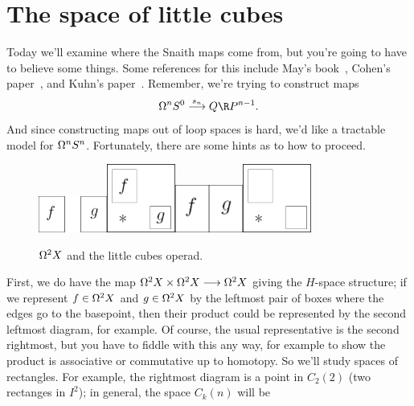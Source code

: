 \section{The space of little cubes} %
\label{TheSpaceOfLittleCubes}
\ifx\OutputTheSpaceOfLittleCubes\undefined\else
Today we'll examine where the Snaith maps come from, but you're going to have to believe some things.  Some references for this include May's book~\cite{May}, Cohen's paper~\cite{Cohen}, and Kuhn's paper~\cite{Kuhn}.  Remember, we're trying to construct maps
\[
\Loops^n S^0 \stackrel{s_n}{\to} Q\RP^{n-1}
.\]
And since constructing maps out of loop spaces is hard, we'd like a tractable model for $\Omega^n S^n$.  Fortunately, there are some hints as to how to proceed.

\begin{figure}[ht!]
\centering\includegraphics[width=0.2\textwidth]{figures/figure35-1.pdf}\;\includegraphics[width=0.2\textwidth]{figures/figure35-2.pdf}\;\includegraphics[width=0.2\textwidth]{figures/figure35-3.pdf}\;\includegraphics[width=0.2\textwidth]{figures/figure35-4.pdf}
\caption{\small $\Omega^2 X$ and the little cubes operad.}
\end{figure}
First, we do have the map $\Omega^2 X \times \Omega^2 X \longrightarrow \Omega^2 X$ giving the $H$-space structure; if we represent $f \in \Omega^2 X$ and $g \in \Omega^2 X$ by the leftmost pair of boxes where the edges go to the basepoint, then their product could be represented by the second leftmost diagram, for example.  Of course, the usual representative is the second rightmost, but you have to fiddle with this any way, for example to show the product is associative or commutative up to homotopy.  So we'll study spaces of rectangles.  For example, the rightmost diagram is a point in $C_2(2)$ (two rectanges in $I^2$); in general, the space $C_k(n)$ will be
